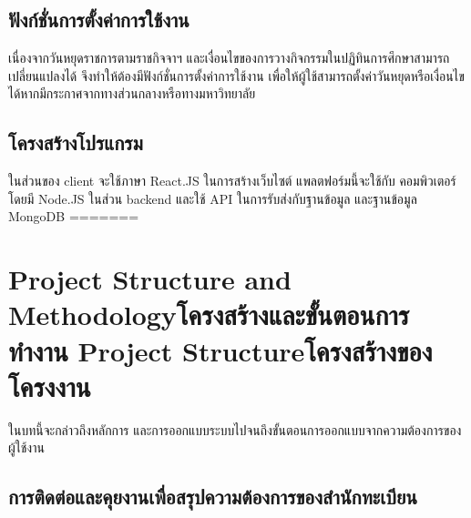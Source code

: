 \section{ฟังก์ชั่นการตั้งค่าการใช้งาน}
เนื่องจากวันหยุดราชการตามราชกิจจาฯ และเงื่อนไขของการวางกิจกรรมในปฏิทินการศึกษาสามารถเปลี่ยนแปลงได้ 
จึงทำให้ต้องมีฟังก์ชั่นการตั้งค่าการใช้งาน เพื่อให้ผู้ใช้สามารถตั้งค่าวันหยุดหรือเงื่อนไขได้หากมีกระกาศจากทางส่วนกลางหรือทางมหาวิทยาลัย

\section{โครงสร้างโปรแกรม}
ในส่วนของ client จะใช้ภาษา React.JS ในการสร้างเว็บไซต์ แพลตฟอร์มนี้จะใช้กับ
คอมพิวเตอร์ โดยมี Node.JS ในส่วน backend และใช้ API ในการรับส่งกับฐานข้อมูล
และฐานข้อมูล MongoDB
=======
\chapter{\ifproject%
\ifenglish Project Structure and Methodology\else โครงสร้างและขั้นตอนการทำงาน\fi
\else%
\ifenglish Project Structure\else โครงสร้างของโครงงาน\fi
\fi
}

ในบทนี้จะกล่าวถึงหลักการ และการออกแบบระบบไปจนถึงขั้นตอนการออกแบบจากความต้องการของผู้ใช้งาน

\makeatletter


\makeatother

\section{การติดต่อและคุยงานเพื่อสรุปความต้องการของสำนักทะเบียน}


  










